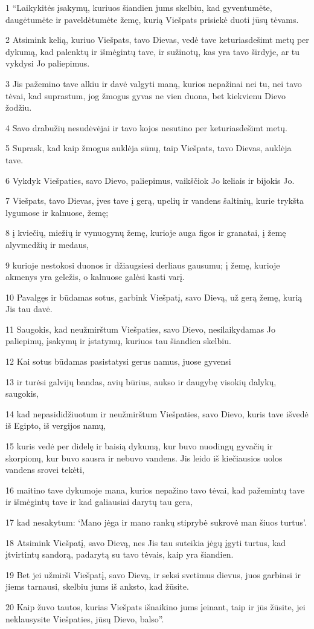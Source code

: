 \par 1 “Laikykitės įsakymų, kuriuos šiandien jums skelbiu, kad gyventumėte, daugėtumėte ir paveldėtumėte žemę, kurią Viešpats prisiekė duoti jūsų tėvams. 
\par 2 Atsimink kelią, kuriuo Viešpats, tavo Dievas, vedė tave keturiasdešimt metų per dykumą, kad palenktų ir išmėgintų tave, ir sužinotų, kas yra tavo širdyje, ar tu vykdysi Jo paliepimus. 
\par 3 Jis pažemino tave alkiu ir davė valgyti maną, kurios nepažinai nei tu, nei tavo tėvai, kad suprastum, jog žmogus gyvas ne vien duona, bet kiekvienu Dievo žodžiu. 
\par 4 Savo drabužių nesudėvėjai ir tavo kojos nesutino per keturiasdešimt metų. 
\par 5 Suprask, kad kaip žmogus auklėja sūnų, taip Viešpats, tavo Dievas, auklėja tave. 
\par 6 Vykdyk Viešpaties, savo Dievo, paliepimus, vaikščiok Jo keliais ir bijokis Jo. 
\par 7 Viešpats, tavo Dievas, įves tave į gerą, upelių ir vandens šaltinių, kurie trykšta lygumose ir kalnuose, žemę; 
\par 8 į kviečių, miežių ir vynuogynų žemę, kurioje auga figos ir granatai, į žemę alyvmedžių ir medaus, 
\par 9 kurioje nestokosi duonos ir džiaugsiesi derliaus gausumu; į žemę, kurioje akmenys yra geležis, o kalnuose galėsi kasti varį. 
\par 10 Pavalgęs ir būdamas sotus, garbink Viešpatį, savo Dievą, už gerą žemę, kurią Jis tau davė. 
\par 11 Saugokis, kad neužmirštum Viešpaties, savo Dievo, nesilaikydamas Jo paliepimų, įsakymų ir įstatymų, kuriuos tau šiandien skelbiu. 
\par 12 Kai sotus būdamas pasistatysi gerus namus, juose gyvensi 
\par 13 ir turėsi galvijų bandas, avių būrius, aukso ir daugybę visokių dalykų, saugokis, 
\par 14 kad nepasididžiuotum ir neužmirštum Viešpaties, savo Dievo, kuris tave išvedė iš Egipto, iš vergijos namų, 
\par 15 kuris vedė per didelę ir baisią dykumą, kur buvo nuodingų gyvačių ir skorpionų, kur buvo sausra ir nebuvo vandens. Jis leido iš kiečiausios uolos vandens srovei tekėti, 
\par 16 maitino tave dykumoje mana, kurios nepažino tavo tėvai, kad pažemintų tave ir išmėgintų tave ir kad galiausiai darytų tau gera, 
\par 17 kad nesakytum: ‘Mano jėga ir mano rankų stiprybė sukrovė man šiuos turtus’. 
\par 18 Atsimink Viešpatį, savo Dievą, nes Jis tau suteikia jėgų įgyti turtus, kad įtvirtintų sandorą, padarytą su tavo tėvais, kaip yra šiandien. 
\par 19 Bet jei užmirši Viešpatį, savo Dievą, ir seksi svetimus dievus, juos garbinsi ir jiems tarnausi, skelbiu jums iš anksto, kad žūsite. 
\par 20 Kaip žuvo tautos, kurias Viešpats išnaikino jums įeinant, taip ir jūs žūsite, jei neklausysite Viešpaties, jūsų Dievo, balso”.



